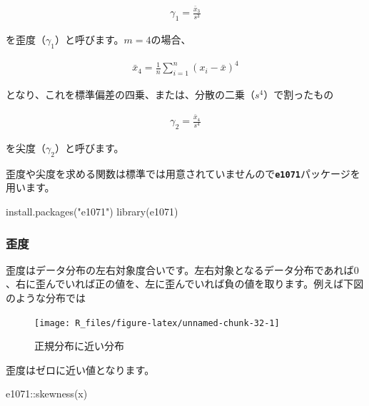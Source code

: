 \documentclass[
  12pt,
]{book}
\newenvironment{Shaded}{\begin{snugshade}}{\end{snugshade}}
\newcommand{\FunctionTok}[1]{\textcolor[rgb]{0.00,0.00,0.00}{#1}}
\newcommand{\NormalTok}[1]{#1}
\newcommand{\SpecialCharTok}[1]{\textcolor[rgb]{0.00,0.00,0.00}{#1}}
\newcommand{\StringTok}[1]{\textcolor[rgb]{0.31,0.60,0.02}{#1}}
\begin{document}
\begin{align}
  \gamma_1 = \frac{\bar{x}_3}{s^3} \label{eq:skewness}
\end{align}

を歪度（\(\gamma_1\)）と呼びます。\(m = 4\)の場合、

\begin{align}
  \bar{x}_4 = \frac{1}{n}\sum_{i = 1}^{n}(x_i - \bar{x})^4  \label{eq:moment4}
\end{align}

となり、これを標準偏差の四乗、または、分散の二乗（\(s^4\)）で割ったもの

\begin{align}
  \gamma_2 = \frac{\bar{x}_4}{s^4} \label{eq:kurtosise}
\end{align}

を尖度（\(\gamma_2\)）と呼びます。

歪度や尖度を求める関数は標準では用意されていませんので\textbf{\texttt{e1071}}パッケージを用います。

\begin{Shaded}
\begin{Highlighting}[numbers=left,,]
\FunctionTok{install.packages}\NormalTok{(}\StringTok{"e1071"}\NormalTok{)}
\FunctionTok{library}\NormalTok{(e1071)}
\end{Highlighting}
\end{Shaded}

\hypertarget{ux6b6aux5ea6}{%
\subsubsection{歪度}\label{ux6b6aux5ea6}}

歪度はデータ分布の左右対象度合いです。左右対象となるデータ分布であれば\(0\)、右に歪んでいれば正の値を、左に歪んでいれば負の値を取ります。例えば下図のような分布では

\begin{figure}[H]

{\centering \texttt{[image: R\_files/figure-latex/unnamed-chunk-32-1]} 

}

\caption{正規分布に近い分布}\label{fig:unnamed-chunk-32}
\end{figure}

歪度はゼロに近い値となります。

\begin{Shaded}
\begin{Highlighting}[numbers=left,,]
\NormalTok{e1071}\SpecialCharTok{::}\FunctionTok{skewness}\NormalTok{(x)}
\end{Highlighting}
\end{Shaded}
\end{document}
